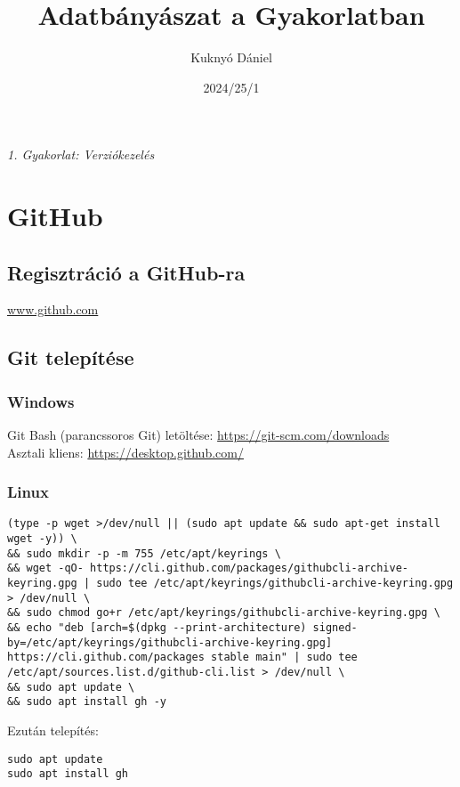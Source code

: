 \documentclass{article}
\title{Adatbányászat a Gyakorlatban}
\author{Kuknyó Dániel}
\date{2024/25/1}
\begin{document}
\maketitle

\begin{center}
\large\textit{1. Gyakorlat: Verziókezelés}
\end{center}

\section{GitHub}
\subsection*{Regisztráció a GitHub-ra}
\href{www.github.com}{www.github.com}

\subsection*{Git telepítése}
\subsubsection*{Windows}
Git Bash (parancssoros Git) letöltése: \href{https://git-scm.com/downloads}{https://git-scm.com/downloads}\\
Asztali kliens: \href{https://desktop.github.com/}{https://desktop.github.com/}

\subsubsection*{Linux}
\begin{lstlisting}
(type -p wget >/dev/null || (sudo apt update && sudo apt-get install wget -y)) \
&& sudo mkdir -p -m 755 /etc/apt/keyrings \
&& wget -qO- https://cli.github.com/packages/githubcli-archive-keyring.gpg | sudo tee /etc/apt/keyrings/githubcli-archive-keyring.gpg > /dev/null \
&& sudo chmod go+r /etc/apt/keyrings/githubcli-archive-keyring.gpg \
&& echo "deb [arch=$(dpkg --print-architecture) signed-by=/etc/apt/keyrings/githubcli-archive-keyring.gpg] https://cli.github.com/packages stable main" | sudo tee /etc/apt/sources.list.d/github-cli.list > /dev/null \
&& sudo apt update \
&& sudo apt install gh -y
\end{lstlisting}
Ezután telepítés:
\begin{lstlisting}
sudo apt update
sudo apt install gh
\end{lstlisting}
\end{document}
